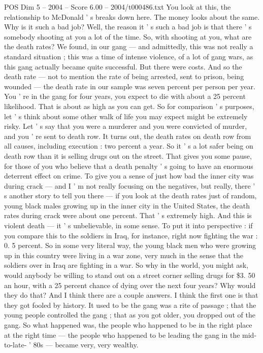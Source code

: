 \begin{textsample}{POS Dim 5 – 2004 – Score 6.00 – 2004/t000486.txt}
You look at this, the relationship to McDonald ' s breaks down here.
The money looks about the same.
Why is it such a bad job?
Well, the reason it ' s such a bad job is that there ' s somebody shooting at you a lot of the time.
So, with shooting at you, what are the death rates?
We found, in our gang — and admittedly, this was not really a standard situation ; this was a time of intense violence, of a lot of gang wars, as this gang actually became quite successful.
But there were costs.
And so the death rate — not to mention the rate of being arrested, sent to prison, being wounded — the death rate in our sample was seven percent per person per year.
You ' re in the gang for four years, you expect to die with about a 25 percent likelihood.
That is about as high as you can get.
So for comparison ' s purposes, let ' s think about some other walk of life you may expect might be extremely risky.
Let ' s say that you were a murderer and you were convicted of murder, and you ' re sent to death row.
It turns out, the death rates on death row from all causes, including execution : two percent a year.
So it ' s a lot safer being on death row than it is selling drugs out on the street.
That gives you some pause, for those of you who believe that a death penalty ' s going to have an enormous deterrent effect on crime.
To give you a sense of just how bad the inner city was during crack — and I ' m not really focusing on the negatives, but really, there ' s another story to tell you there — if you look at the death rates just of random, young black males growing up in the inner city in the United States, the death rates during crack were about one percent.
That ' s extremely high.
And this is violent death — it ' s unbelievable, in some sense.
To put it into perspective : if you compare this to the soldiers in Iraq, for instance, right now fighting the war : 0. 5 percent.
So in some very literal way, the young black men who were growing up in this country were living in a war zone, very much in the sense that the soldiers over in Iraq are fighting in a war.
So why in the world, you might ask, would anybody be willing to stand out on a street corner selling drugs for \$3. 50 an hour, with a 25 percent chance of dying over the next four years?
Why would they do that?
And I think there are a couple answers.
I think the first one is that they got fooled by history.
It used to be the gang was a rite of passage ; that the young people controlled the gang ; that as you got older, you dropped out of the gang.
So what happened was, the people who happened to be in the right place at the right time — the people who happened to be leading the gang in the mid-to-late- ' 80s — became very, very wealthy.

\end{textsample}
